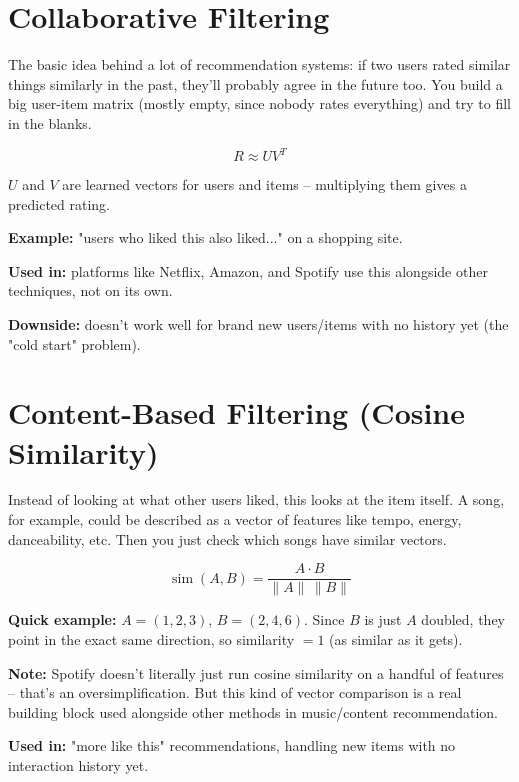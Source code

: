 \documentclass[11pt]{article}
\begin{document}
\section{Collaborative Filtering}

The basic idea behind a lot of recommendation systems: if two users rated similar things similarly in the past, they'll probably agree in the future too. You build a big user-item matrix (mostly empty, since nobody rates everything) and try to fill in the blanks.

\[
R \approx U V^T
\]

$U$ and $V$ are learned vectors for users and items -- multiplying them gives a predicted rating.

\textbf{Example:} "users who liked this also liked..." on a shopping site.

\textbf{Used in:} platforms like Netflix, Amazon, and Spotify use this alongside other techniques, not on its own.

\textbf{Downside:} doesn't work well for brand new users/items with no history yet (the "cold start" problem).

\section{Content-Based Filtering (Cosine Similarity)}

Instead of looking at what other users liked, this looks at the item itself. A song, for example, could be described as a vector of features like tempo, energy, danceability, etc. Then you just check which songs have similar vectors.

\[
\operatorname{sim}(A,B) = \frac{A \cdot B}{\lVert A \rVert \, \lVert B \rVert}
\]

\textbf{Quick example:} $A=(1,2,3)$, $B=(2,4,6)$. Since $B$ is just $A$ doubled, they point in the exact same direction, so similarity $= 1$ (as similar as it gets).

\textbf{Note:} Spotify doesn't literally just run cosine similarity on a handful of features -- that's an oversimplification. But this kind of vector comparison is a real building block used alongside other methods in music/content recommendation.

\textbf{Used in:} "more like this" recommendations, handling new items with no interaction history yet.

\end{document}
